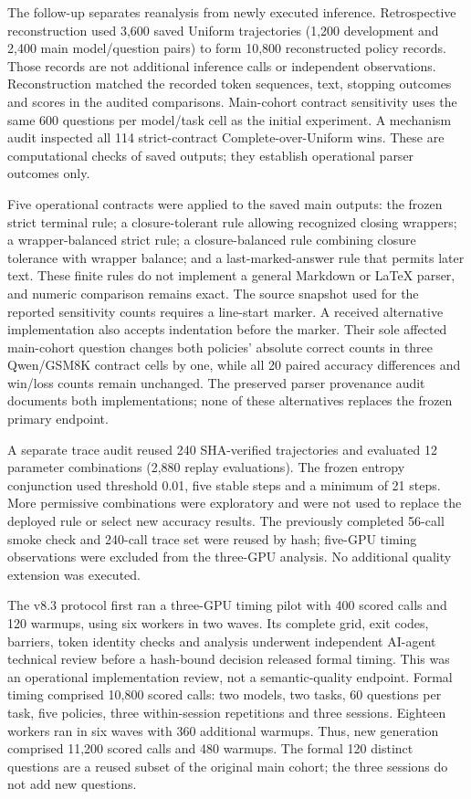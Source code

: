 \documentclass[
  12pt,
  a4paper,
]{article}
\begin{document}
The follow-up separates reanalysis from newly executed inference.
Retrospective reconstruction used 3,600 saved Uniform trajectories
(1,200 development and 2,400 main model/question pairs) to form 10,800
reconstructed policy records. Those records are not additional inference
calls or independent observations. Reconstruction matched the recorded
token sequences, text, stopping outcomes and scores in the audited
comparisons. Main-cohort contract sensitivity uses the same 600
questions per model/task cell as the initial experiment. A mechanism
audit inspected all 114 strict-contract Complete-over-Uniform wins.
These are computational checks of saved outputs; they establish
operational parser outcomes only.

Five operational contracts were applied to the saved main outputs: the
frozen strict terminal rule; a closure-tolerant rule allowing recognized
closing wrappers; a wrapper-balanced strict rule; a closure-balanced
rule combining closure tolerance with wrapper balance; and a
last-marked-answer rule that permits later text. These finite rules do
not implement a general Markdown or LaTeX parser, and numeric comparison
remains exact. The source snapshot used for the reported sensitivity
counts requires a line-start marker. A received alternative
implementation also accepts indentation before the marker. Their sole
affected main-cohort question changes both policies' absolute correct
counts in three Qwen/GSM8K contract cells by one, while all 20 paired
accuracy differences and win/loss counts remain unchanged. The preserved
parser provenance audit documents both implementations; none of these
alternatives replaces the frozen primary endpoint.

A separate trace audit reused 240 SHA-verified trajectories and
evaluated 12 parameter combinations (2,880 replay evaluations). The
frozen entropy conjunction used threshold 0.01, five stable steps and a
minimum of 21 steps. More permissive combinations were exploratory and
were not used to replace the deployed rule or select new accuracy
results. The previously completed 56-call smoke check and 240-call trace
set were reused by hash; five-GPU timing observations were excluded from
the three-GPU analysis. No additional quality extension was executed.

The v8.3 protocol first ran a three-GPU timing pilot with 400 scored
calls and 120 warmups, using six workers in two waves. Its complete
grid, exit codes, barriers, token identity checks and analysis underwent
independent AI-agent technical review before a hash-bound decision
released formal timing. This was an operational implementation review,
not a semantic-quality endpoint. Formal timing comprised 10,800 scored
calls: two models, two tasks, 60 questions per task, five policies,
three within-session repetitions and three sessions. Eighteen workers
ran in six waves with 360 additional warmups. Thus, new generation
comprised 11,200 scored calls and 480 warmups. The formal 120 distinct
questions are a reused subset of the original main cohort; the three
sessions do not add new questions.
\end{document}
